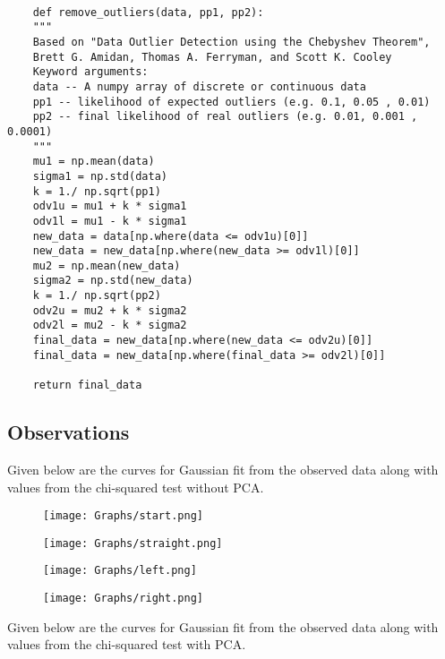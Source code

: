 \begin{tcolorbox}
\begin{verbatim}

	def remove_outliers(data, pp1, pp2):
	"""
	Based on "Data Outlier Detection using the Chebyshev Theorem",
	Brett G. Amidan, Thomas A. Ferryman, and Scott K. Cooley
	Keyword arguments:
	data -- A numpy array of discrete or continuous data
	pp1 -- likelihood of expected outliers (e.g. 0.1, 0.05 , 0.01)
	pp2 -- final likelihood of real outliers (e.g. 0.01, 0.001 , 0.0001)
	"""
	mu1 = np.mean(data)
	sigma1 = np.std(data)
	k = 1./ np.sqrt(pp1)
	odv1u = mu1 + k * sigma1
	odv1l = mu1 - k * sigma1
	new_data = data[np.where(data <= odv1u)[0]]
	new_data = new_data[np.where(new_data >= odv1l)[0]]
	mu2 = np.mean(new_data)
	sigma2 = np.std(new_data)
	k = 1./ np.sqrt(pp2)
	odv2u = mu2 + k * sigma2
	odv2l = mu2 - k * sigma2
	final_data = new_data[np.where(new_data <= odv2u)[0]]
	final_data = new_data[np.where(final_data >= odv2l)[0]]
	
	return final_data
\end{verbatim}
\end{tcolorbox}
	
	
\newpage	
\subsection{Observations}
		
Given below are the curves for Gaussian fit from the observed data {\color{blue}along with values from the chi-squared test without PCA.}


\begin{figure}[H]
	\centering
	\texttt{[image: Graphs/start.png]}
\end{figure}

\begin{figure}[H]
	\centering
	\texttt{[image: Graphs/straight.png]}
\end{figure}

\begin{figure}[H]
	\centering
	\texttt{[image: Graphs/left.png]}
\end{figure}

\begin{figure}[H]
	\centering
	\texttt{[image: Graphs/right.png]}
\end{figure}

{\color{blue}Given below are the curves for Gaussian fit from the observed data along with values from the chi-squared test with PCA.}

